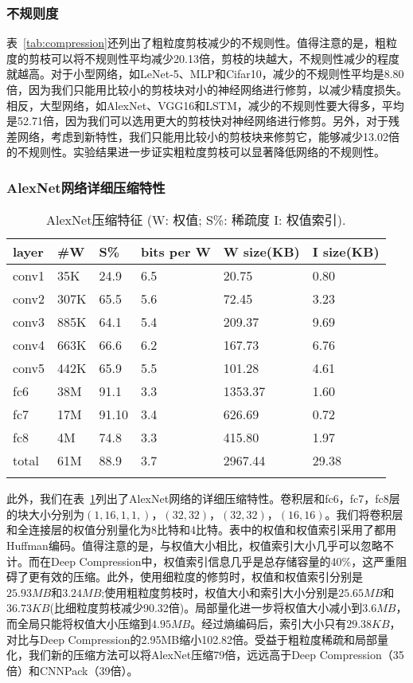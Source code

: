 \subsubsection{不规则度}
表~\ref{tab:compression}还列出了粗粒度剪枝减少的不规则性。值得注意的是，粗粒度的剪枝可以将不规则性平均减少20.13倍，剪枝的块越大，不规则性减少的程度就越高。对于小型网络，如LeNet-5、MLP和Cifar10，减少的不规则性平均是8.80倍，因为我们只能用比较小的剪枝块对小的神经网络进行修剪，以减少精度损失。相反，大型网络，如AlexNet、VGG16和LSTM，减少的不规则性要大得多，平均是52.71倍，因为我们可以选用更大的剪枝快对神经网络进行修剪。另外，对于残差网络，考虑到新特性，我们只能用比较小的剪枝块来修剪它，能够减少13.02倍的不规则性。实验结果进一步证实粗粒度剪枝可以显著降低网络的不规则性。


\subsubsection{AlexNet网络详细压缩特性}
\begin{table}[h]
\centering
\caption{AlexNet压缩特征 (W: 权值; S\%: 稀疏度 I: 权值索引).}
\begin{tabular}{llllll}
\toprule
layer  	& \#W 	& S\%		& bits per W	& W size(KB)& I size(KB) \\
\midrule
conv1 	& 35K	& 24.9		& 6.5 			& 20.75 	& 0.80 \\
conv2 	& 307K	& 65.5		& 5.6 			& 72.45 	& 3.23 \\
conv3 	& 885K	& 64.1		& 5.4 			& 209.37 	& 9.69 \\
conv4 	& 663K	& 66.6		& 6.2 			& 167.73 	& 6.76 \\
conv5 	& 442K 	& 65.9		& 5.5 			& 101.28 	& 4.61 \\
\midrule
fc6 	& 38M 	& 91.1	& 3.3			& 1353.37	& 1.60 \\
fc7 	& 17M 	& 91.10		& 3.4 			& 626.69 	& 0.72 \\
fc8 	& 4M 	& 74.8		& 3.3 			& 415.80	& 1.97 \\
\midrule
total	& 61M	& 88.9		& 3.7			& 2967.44	& 29.38 \\
\bottomrule
\label{tab:AlexNet}
\end{tabular}
\end{table}

此外，我们在表~\ref{tab:AlexNet}列出了AlexNet网络的详细压缩特性。卷积层和fc6，fc7，fc8层的块大小分别为$(1, 16, 1, 1,)$，$(32, 32)$，$(32, 32)$，$(16,16)$。我们将卷积层和全连接层的权值分别量化为8比特和4比特。表中的权值和权值索引采用了都用Huffman编码。值得注意的是，与权值大小相比，权值索引大小几乎可以忽略不计。而在Deep Compression中，权值索引信息几乎是总存储容量的40\%，这严重阻碍了更有效的压缩。此外，使用细粒度的修剪时，权值和权值索引分别是$25.93MB$和$3.24MB$;使用粗粒度剪枝时，权值大小和索引大小分别是$25.65MB$和$36.73KB$(比细粒度剪枝减少90.32倍)。局部量化进一步将权值大小减小到$3.6MB$，而全局只能将权值大小压缩到$4.95MB$。经过熵编码后，索引大小只有$29.38KB$，对比与Deep Compression的2.95MB缩小102.82倍。受益于粗粒度稀疏和局部量化，我们新的压缩方法可以将AlexNet压缩79倍，远远高于Deep Compression（35倍）和CNNPack（39倍）。

